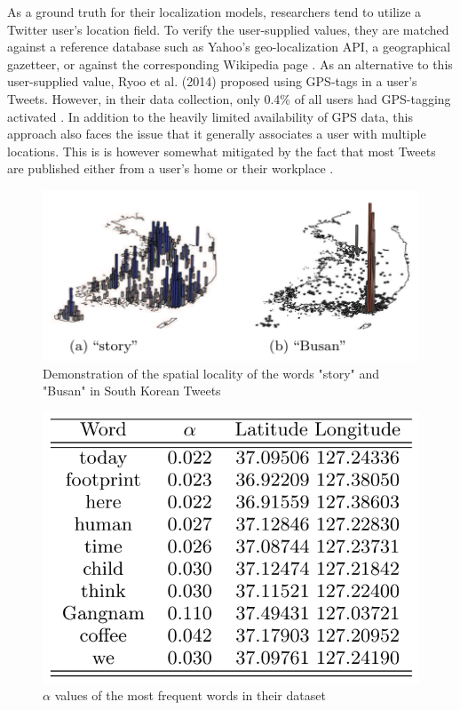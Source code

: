 \documentclass[10pt,a4paper]{article}
\begin{document}
As a ground truth for their localization models, researchers tend to utilize a Twitter user's location field. To verify the user-supplied values, they are matched against a reference database such as Yahoo's geo-localization API, a geographical gazetteer, or against the corresponding Wikipedia page \cite{gonz11a, hech11a, mahm14a}. As an alternative to this user-supplied value, Ryoo et al. (2014) proposed using GPS-tags in a user's Tweets. However, in their data collection, only 0.4\% of all users had GPS-tagging activated \cite{ryoo14a}. In addition to the heavily limited availability of GPS data, this approach also faces the issue that it generally associates a user with multiple locations. This is is however somewhat mitigated by the fact that most Tweets are published either from a user's home or their workplace \cite{ryoo14a}.

\begin{figure}
	\centering
	\includegraphics[scale=0.60]{spatial-locality-of-words}
	\caption{Demonstration of the spatial locality of the words "story" and "Busan" in South Korean Tweets \cite{ryoo14a}}
	\label{fig:spatial-locality-of-words}
\end{figure}

\begin{figure}
	\centering
	\includegraphics[scale=0.60]{alpha-values-of-frequent-words}
	\caption{$\alpha$ values of the most frequent words in their dataset \cite{ryoo14a}}
	\label{fig:alpha-values-of-frequent-words}
\end{figure}
\end{document}
